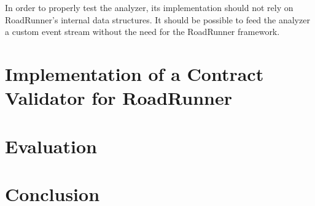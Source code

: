 In order to properly test the analyzer, its implementation should not rely on
RoadRunner's internal data structures. It should be possible to feed the
analyzer a custom event stream without the need for the RoadRunner framework.



\chapter{Implementation of a Contract Validator for RoadRunner}
\label{chFive}

\todo{}



\chapter{Evaluation}
\label{chSix}

\todo{}



\chapter{Conclusion}

\todo{}
